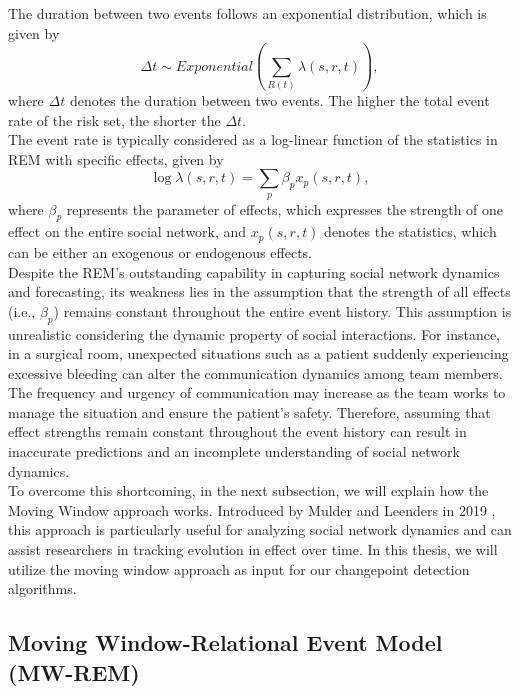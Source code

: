 \documentclass[]{interact}
\theoremstyle{plain}%
\theoremstyle{definition}
\theoremstyle{remark}
\begin{document}
	The duration between two events follows an exponential distribution\cite{buttsRelationalEventFramework2008}, which is given by
	\begin{equation} \label{2}
		\Delta t \sim Exponential \left(\sum_{R(t)} \lambda(s,r,t) \right),
	\end{equation}
	where $\Delta t$ denotes the duration between two events. The higher the total event rate of the risk set, the shorter the $\Delta t$. \\
	
	The event rate is typically considered as a log-linear function of the statistics in REM with specific effects\cite{buttsRelationalEventFramework2008}, given by
	\begin{equation} \label{3}
		\log \lambda(s,r,t) = \sum_{p} \beta_p x_p(s,r,t),
	\end{equation}
	where $\beta_p$ represents the parameter of effects, which expresses the strength of one effect on the entire social network, and $x_p(s,r,t)$ denotes the statistics, which can be either an exogenous or endogenous effects. \\
	
	Despite the REM's outstanding capability in capturing social network dynamics and forecasting, its weakness lies in the assumption that the strength of all effects (i.e., $\beta_p$) remains constant throughout the entire event history. This assumption is unrealistic considering the dynamic property of social interactions. For instance, in a surgical room, unexpected situations such as a patient suddenly experiencing excessive bleeding can alter the communication dynamics among team members. The frequency and urgency of communication may increase as the team works to manage the situation and ensure the patient's safety. Therefore, assuming that effect strengths remain constant throughout the event history can result in inaccurate predictions and an incomplete understanding of social network dynamics. \\
	
	To overcome this shortcoming, in the next subsection, we will explain how the Moving Window approach works. Introduced by Mulder and Leenders in 2019 \cite{mulderModelingEvolutionInteraction2019}, this approach is particularly useful for analyzing social network dynamics and can assist researchers in tracking evolution in effect over time. In this thesis, we will utilize the moving window approach as input for our changepoint detection algorithms.
	
	\subsection{Moving Window-Relational Event Model (MW-REM)} \label{sec:MW-REM}
	
\end{document}

